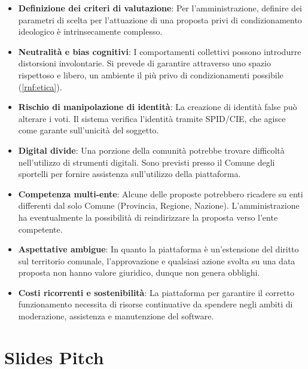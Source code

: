 \begin{itemize}

  \item \textbf{Definizione dei criteri di valutazione}:
 Per l'amministrazione, definire dei parametri di scelta per l'attuazione di una proposta privi di condizionamento ideologico è intrinsecamente complesso.

  \item \textbf{Neutralità e bias cognitivi}:
 	I comportamenti collettivi possono introdurre distorsioni involontarie.
 	Si prevede di garantire attraverso uno spazio rispettoso e libero, un ambiente il più privo di condizionamenti possibile (\ref{rnf:etica}). 
 	
  \item \textbf{Rischio di manipolazione di identità}:
  La creazione di identità false può alterare i voti.
  Il sistema verifica l'identità tramite SPID/CIE, che agisce come garante sull'unicità del soggetto.

  \item \textbf{Digital divide}:
  Una porzione della comunità potrebbe trovare difficoltà nell'utilizzo di strumenti digitali.
  Sono previsti presso il Comune degli sportelli per fornire assistenza sull'utilizzo della piattaforma.

  \item \textbf{Competenza multi-ente}:
  Alcune delle proposte potrebbero ricadere su enti differenti dal solo Comune (Provincia, Regione, Nazione).
  L'amministrazione ha eventualmente la possibilità di reindirizzare la proposta verso l'ente competente.

  \item \textbf{Aspettative ambigue}:
  In quanto la piattaforma è un'estensione del diritto sul territorio comunale, l'approvazione e qualsiasi azione svolta su una data proposta non hanno valore giuridico, dunque non genera obblighi.

  \item \textbf{Costi ricorrenti e sostenibilità}:
  La piattaforma per garantire il corretto funzionamento necessita di risorse continuative da spendere negli ambiti di moderazione, assistenza e manutenzione del software.
  
\end{itemize}

\newpage
\section*{Slides Pitch}

